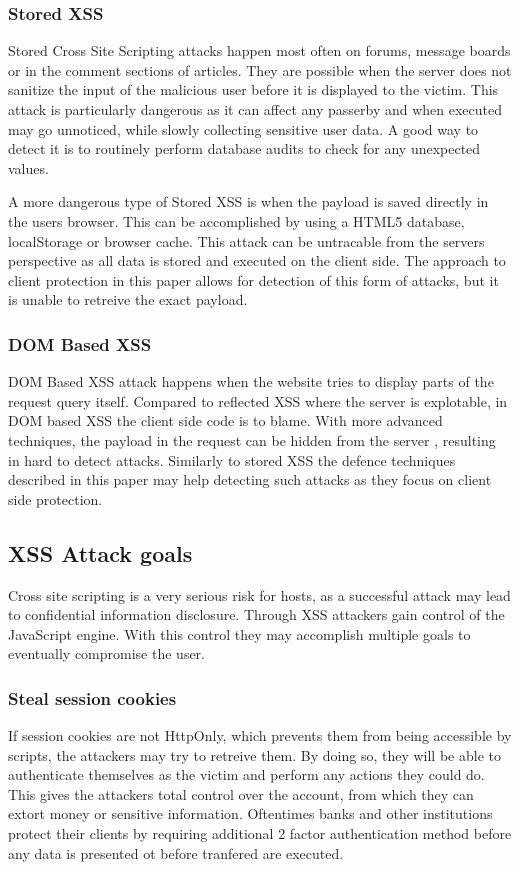 \subsubsection{Stored XSS}
Stored Cross Site Scripting attacks happen most often on forums, message boards or in the comment sections of articles.
They are possible when the server does not sanitize the input of the malicious user before it is displayed to the victim.
This attack is particularly dangerous as it can affect any passerby and when executed may go unnoticed, while slowly collecting sensitive user data.
A good way to detect it is to routinely perform database audits to check for any unexpected values.

A more dangerous type of Stored XSS is when the payload is saved directly in the users browser.
This can be accomplished by using a HTML5 database, localStorage or browser cache.
This attack can be untracable from the servers perspective as all data is stored and executed on the client side.
The approach to client protection in this paper allows for detection of this form of attacks, but it is unable to retreive the exact payload.

\subsubsection{DOM Based XSS}
DOM Based XSS attack happens when the website tries to display parts of the request query itself.
Compared to reflected XSS where the server is explotable, in DOM based XSS the client side code is to blame.
With more advanced techniques, the payload in the request can be hidden from the server \cite{domxss}, resulting in hard to detect attacks.
Similarly to stored XSS the defence techniques described in this paper may help detecting such attacks as they focus on client side protection.

\subsection{XSS Attack goals}
Cross site scripting is a very serious risk for hosts, as a successful attack may lead to confidential information disclosure.
Through XSS attackers gain control of the JavaScript engine.
With this control they may accomplish multiple goals to eventually compromise the user.

\subsubsection{Steal session cookies}
If session cookies are not HttpOnly, which prevents them from being accessible by scripts, the attackers may try to retreive them.
By doing so, they will be able to authenticate themselves as the victim and perform any actions they could do.
This gives the attackers total control over the account, from which they can extort money or sensitive information.
Oftentimes banks and other institutions protect their clients by requiring additional 2 factor authentication method before any data is presented ot before tranfered are executed.

